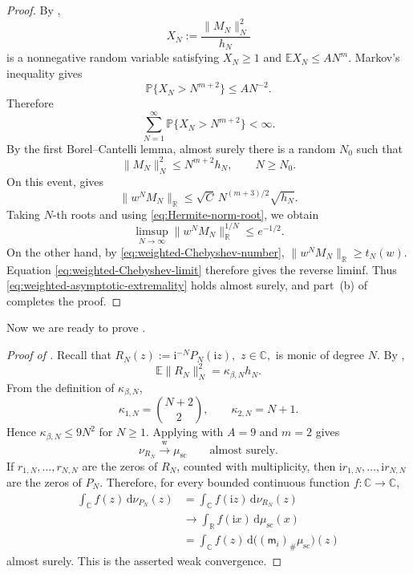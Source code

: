 \documentclass[11pt,reqno]{amsart}
\numberwithin{equation}{section}
\theoremstyle{definition}
\theoremstyle{remark}
\newcommand{\E}{\mathbb E}
\newcommand{\Pp}{\mathbb P}
\newcommand{\R}{\mathbb R}
\newcommand{\C}{\mathbb C}
\newcommand{\1}{\mathbf 1}
\newcommand{\dd}{\mathrm d}
\newcommand{\ii}{\mathrm i}
\newcommand{\weak}{\xrightarrow{\mathrm w}}
\begin{document}
\begin{proof}
By ,
\[
  X_N:=\frac{\|M_N\|_N^2}{h_N}
\]
is a nonnegative random variable satisfying \(X_N\ge1\) and
\(\E X_N\le A N^m\).  Markov's inequality gives
\[
  \Pp\{X_N>N^{m+2}\}\le A N^{-2}.
\]
Therefore
\[
  \sum_{N=1}^{\infty}\Pp\{X_N>N^{m+2}\}<\infty.
\]
By the first Borel--Cantelli lemma, almost surely there is a random
\(N_0\) such that
\[
  \|M_N\|_N^2\le N^{m+2}h_N,
  \qquad N\ge N_0.
\]
On this event,  gives
\[
  \|w^NM_N\|_{\R}
  \le
  \sqrt C\,N^{(m+3)/2}\sqrt{h_N}.
\]
Taking \(N\)-th roots and using \eqref{eq:Hermite-norm-root}, we obtain
\[
  \limsup_{N\to\infty}\|w^NM_N\|_{\R}^{1/N}
  \le
  e^{-1/2}.
\]
On the other hand, by \eqref{eq:weighted-Chebyshev-number},
\(\|w^NM_N\|_{\R}\ge t_N(w)\).  Equation
\eqref{eq:weighted-Chebyshev-limit} therefore gives the reverse liminf.
Thus \eqref{eq:weighted-asymptotic-extremality} holds almost surely, and
part~\textup{(b)} of  completes the proof.
\end{proof}

Now we are ready to prove .

\begin{proof}[Proof of ]
Recall that
\(
  R_N(z):=\ii^{-N}P_N(\ii z),
\,\, z\in\C,
\)
is monic of degree \(N\).  By ,
\[
  \E\|R_N\|_N^2
  =
  \kappa_{\beta,N}h_N.
\]
From the definition of \(\kappa_{\beta,N}\),
\[
  \kappa_{1,N}=\binom{N+2}{2},
  \qquad
  \kappa_{2,N}=N+1.
\]
Hence \(\kappa_{\beta,N}\le9N^2\) for \(N\ge1\).  Applying
 with \(A=9\) and \(m=2\) gives
\[
  \nu_{R_N}\weak\mu_{\mathrm{sc}}
  \qquad\text{almost surely.}
\]
If \(r_{1,N},\dots,r_{N,N}\) are the zeros of \(R_N\), counted with
multiplicity, then \(\ii r_{1,N},\dots,\ii r_{N,N}\) are the zeros of
\(P_N\).  Therefore, for every bounded continuous function
\(f:\C\to\C\),
\begin{align*}
  \int_{\C}f(z)\,\dd\nu_{P_N}(z)
  &=
  \int_{\C}f(\ii z)\,\dd\nu_{R_N}(z)\\
  &\to
  \int_{\R}f(\ii x)\,\dd\mu_{\mathrm{sc}}(x)\\
  &=
  \int_{\C}f(z)\,
  \dd\bigl((\mathsf m_i)_\#\mu_{\mathrm{sc}}\bigr)(z)
\end{align*}
almost surely.  This is the asserted weak convergence.  
\end{proof}
\end{document}
